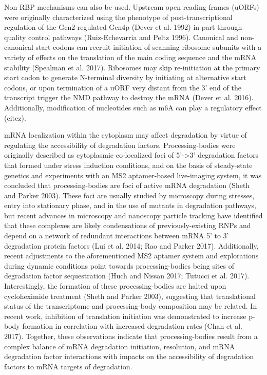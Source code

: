 Non-RBP
mechanisms can also be used. Upstream open reading frames (uORFs) were
originally characterized using the phenotype of post-transcriptional
regulation of the Gcn2-regulated Gcn4p (Dever et al. 1992) in part
through quality control pathways (Ruiz-Echevarria and Peltz 1996).
Canonical and non-canonical start-codons can recruit initiation of
scanning ribosome subunits with a variety of effects on the
translation of the main coding sequence and the mRNA stability
(Spealman et al. 2017). Ribosomes may skip re-initiation at the
primary start codon to generate N-terminal diversity by initiating at
alternative start codons, or upon termination of a uORF very distant
from the 3’ end of the transcript trigger the NMD pathway to destroy
the mRNA (Dever et al. 2016). Additionally, modification of
nucleotides such as m6A can play a regulatory effect (citez).  

mRNA
localization within the cytoplasm may affect degradation by virtue of
regulating the accessibility of degradation factors. Processing-bodies
were originally described as cytoplasmic co-localized foci of 5’->3’
degradation factors that formed under stress induction conditions, and
on the basis of steady-state genetics and experiments with an MS2
aptamer-based live-imaging system, it was concluded that
processing-bodies are foci of active mRNA degradation (Sheth and
Parker 2003). These foci are usually studied by microscopy during
stresses, entry into stationary phase, and in the use of mutants in
degradation pathways, but recent advances in microscopy and nanoscopy
particle tracking have identified that these complexes are likely
condensations of previously-existing RNPs and depend on a network of
redundant interactions between mRNA 5’ to 3’ degradation protein
factors (Lui et al. 2014; Rao and Parker 2017). Additionally, recent
adjustments to the aforementioned MS2 aptamer system and explorations
during dynamic conditions point towards processing-bodies being sites
of degradation factor sequestration (Huch and Nissan 2017; Tutucci et
al. 2017). Interestingly, the formation of these processing-bodies are
halted upon cycloheximide treatment (Sheth and Parker 2003),
suggesting that translational status of the transcriptome and
processing-body composition may be related. In recent work, inhibition
of translation initiation was demonstrated to increase p-body
formation in correlation with increased degradation rates (Chan et al.
2017). Together, these observations indicate that processing-bodies
result from a complex balance of mRNA degradation initiation,
resolution, and mRNA degradation factor interactions with impacts on
the accessibility of degradation factors to mRNA targets of
degradation.  

